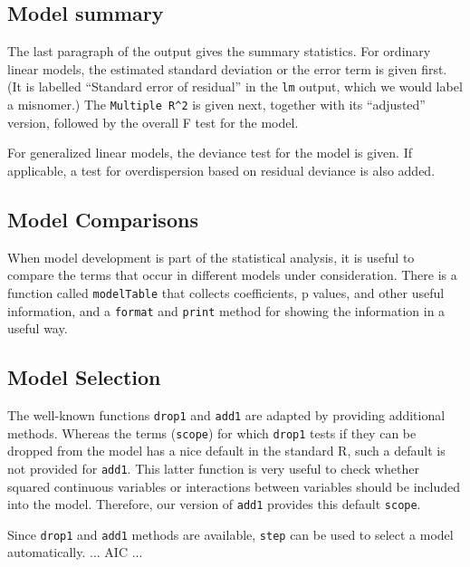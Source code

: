 \documentclass{article}
\providecommand{\T}{\texttt}
\providecommand{\Vneed}[1]{\penalty-5000\vskip#1%
\penalty-5000\vspace{-#1}}
\begin{document}
\subsection{Model summary}
The last paragraph of the output gives the summary statistics.
For ordinary linear models, the estimated standard deviation or the error
term is given first. (It is labelled ``Standard error of residual'' in the 
\T{lm} output, which we would label a misnomer.)
The \T{Multiple R\^{}2} is given next, together with its ``adjusted''
version, followed by the overall F test for the model.

For generalized linear models, the deviance test for the model is given.
If applicable, a test for overdispersion based on residual deviance is also
added. 

\subsection{Model Comparisons}
When model development is part of the statistical analysis, it is useful to
compare the terms that occur in different models under consideration.
There is a function called \T{modelTable} that collects coefficients, 
p values, and other useful information, and a \T{format} and \T{print} 
method for showing the information in a useful way.

\subsection{Model Selection}
The well-known functions \T{drop1} and \T{add1} are adapted by 
providing additional methods. 
Whereas the terms (\T{scope}) for which \T{drop1} tests if they can be
dropped from the model has a nice default in the standard R, such a default
is not provided for \T{add1}. 
This latter function is very useful to check whether squared continuous
variables or interactions between variables should be included into the
model. Therefore, our version of \T{add1} provides this default \T{scope}. 

Since \T{drop1} and \T{add1} methods are available, \T{step} can be used to
select a model automatically.
... AIC ...

\Vneed{50mm}
\end{document}
